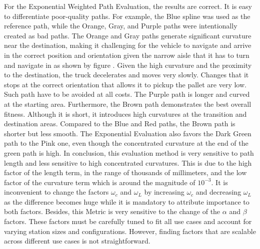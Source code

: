 For the Exponential Weighted Path Evaluation, the results are correct. It is easy to differentiate poor-quality paths. 
For example, the Blue spline was used as the reference path, while the Orange, Gray, and Purple paths were intentionally 
created as bad paths. The Orange and Gray paths generate significant curvature near the destination, making it 
challenging for the vehicle to navigate and arrive in the correct position and orientation given the narrow aisle 
that it has to turn and navigate in as shown by figure  . Given the high curvature and the proximity to the
destination, the truck decelerates and moves very slowly. Changes that it stops at the correct orientation 
that allows it to pickup the pallet are very low. Such path have to be avoided at all costs. The Purple path is longer 
and curved at the starting area. Furthermore, the Brown path demonstrates the best overall fitness. Although it is 
short, it introduces high curvatures at the transition and destination areas. Compared to the Blue and Red paths, 
the Brown path is shorter but less smooth. 
The Exponential Evaluation also favors the Dark Green path to the Pink one, even though the concentrated 
curvature at the end of the green path is high.
In conclusion, this evaluation method is very sensitive to path length and less 
sensitive to high concentrated curvatures. This is due to the high factor of the length term, in the range 
of thousands of millimeters, and the low factor of the curvature term which is around the magnitude of \(10^{-3}\).
It is inconvenient to change the factors \(\omega_c\) and \(\omega_L\) by increasing \(\omega_c\) and 
decreasing \(\omega_L\) as the difference becomes huge while it is mandatory to attribute 
importance to both factors. Besides, this Metric is very sensitive to the change of the \(\alpha\) and \(\beta\) factors.
These factors must be carefully tuned to fit all use cases and account for varying station sizes and configurations. 
However, finding factors that are scalable across different use cases is not straightforward.

